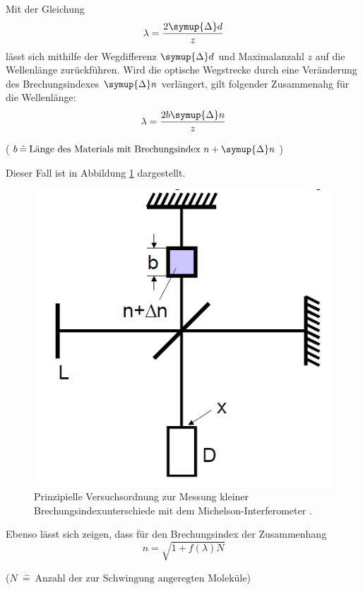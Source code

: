 Mit der Gleichung
\begin{equation}
  \lambda=\frac{2 \symup{\Delta} d}{z}
\end{equation}
lässt sich mithilfe der Wegdifferenz $\symup{\Delta} d$ und Maximalanzahl $z$ auf die Wellenlänge zurückführen.
Wird die optische Wegstrecke durch eine Veränderung des Brechungsindexes $\symup{\Delta} n$ verlängert, gilt folgender Zusammenahg für die Wellenlänge:
\begin{equation}
  \lambda=\frac{2b \symup{\Delta} n}{z}
\end{equation}
\begin{center}
 \small {($ b \: \hat{=} \:\text{Länge des Materials mit Brechungsindex $n+\symup{\Delta} n$}$)}
\end{center}
Dieser Fall ist in Abbildung \ref{fig:SA2} dargestellt.
\begin{figure}[H]
  \centering
  \includegraphics[scale=0.55]{Text/Bilder/schematischerAufbau2.png}
  \caption{Prinzipielle Versuchsordnung zur Messung kleiner Brechungsindexunterschiede mit dem Michelson-Interferometer \cite[10]{sample}.}
  \label{fig:SA2}
\end{figure}
Ebenso lässt sich zeigen, dass für den Brechungsindex der Zusammenhang
\begin{equation}
  n = \sqrt{1+f(\lambda)N}
\end{equation}
\begin{center}
 \small {($ N \: \hat{=} \:\text{Anzahl der zur Schwingung angeregten Moleküle}$)}
\end{center}
